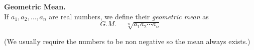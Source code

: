 \documentclass{article}
\begin{document}
\textbf{Geometric Mean.}\\
If  $a_1,a_2,\ldots,a_n$ are real numbers, we define their \emph{geometric mean} as
$$G.M. =\sqrt[n]{a_1a_2\cdots a_n}$$
\bigskip

{\footnotesize
(We usually require the numbers to be non negative so the mean always exists.)
}
\end{document}
